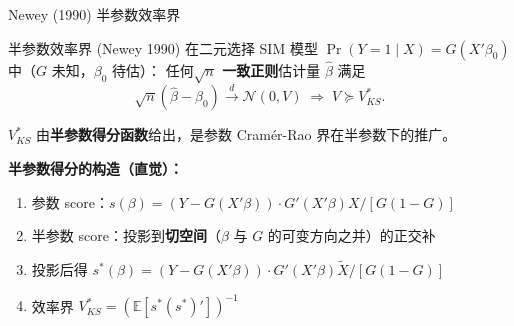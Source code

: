 \documentclass[aspectratio=169, 10pt]{beamer}
\begin{document}
\begin{frame}{Newey (1990) 半参数效率界}

  \begin{definitionbox}{{半参数效率界 (Newey 1990)}}
    在二元选择 SIM 模型 $\Pr(Y=1\mid X) = G(X'\beta_0)$ 中（$G$ 未知，$\beta_0$ 待估）：
    任何\textbf{$\sqrt{n}$ 一致正则}估计量 $\hat\beta$ 满足
    $$\sqrt{n}(\hat\beta - \beta_0) \overset{d}{\to} \mathcal{N}(0, V) \;\Rightarrow\; V \succeq V^{*}_{KS}.$$

    $V^{*}_{KS}$ 由\textbf{半参数得分函数}给出，是参数 Cramér-Rao 界在半参数下的推广。
  \end{definitionbox}

  \begin{highlightbox}
    \textbf{半参数得分的构造（直觉）：}
    \begin{enumerate}\setlength{\itemsep}{1pt}
      \item 参数 score：$s(\beta) = (Y - G(X'\beta)) \cdot G'(X'\beta) X / [G(1-G)]$
      \item 半参数 score：投影到\textbf{切空间}（$\beta$ 与 $G$ 的可变方向之并）的正交补
      \item 投影后得 $s^{*}(\beta) = (Y - G(X'\beta)) \cdot G'(X'\beta) \tilde X / [G(1-G)]$
      \item 效率界 $V^{*}_{KS} = (\mathbb{E}[s^{*} (s^{*})'])^{-1}$
    \end{enumerate}
  \end{highlightbox}

  \hfill{\scriptsize\hyperlink{proof-c10}{}}

\end{frame}
\end{document}
